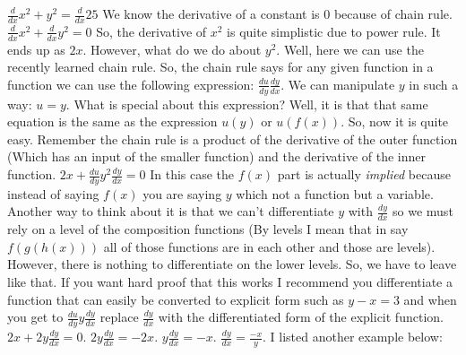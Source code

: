 \documentclass{article}
\begin{document}
\newline
\newline
$\frac{d}{dx} x^2+y^2=\frac{d}{dx}25$
\newline
We know the derivative of a constant is $0$ because of chain rule.
\newline
$\frac{d}{dx} x^2+\frac{d}{dx}y^2=0$
\newline
So, the derivative of $x^2$ is quite simplistic due to power rule. It ends up as $2x$. However, what do we do about $y^2$. Well, here we can use the recently learned chain rule. So, the chain rule says for any given function in a function we can use the following expression: $\frac{du}{dy}\frac{dy}{dx}$. We can manipulate $y$ in such a way: $u = y$. What is special about this expression? Well, it is that that same equation is the same as the expression $u(y)$ or $u(f(x))$. So, now it is quite easy. Remember the chain rule is a product of the derivative of the outer function (Which has an input of the smaller function) and the derivative of the inner function.
\newline
$2x+\frac{du}{dy}y^2\frac{dy}{dx}=0$
\newline
In this case the $f(x)$ part is actually \textit{implied} because instead of saying $f(x)$ you are saying $y$ which not a function but a variable. Another way to think about it is that we can't differentiate $y$ with $\frac{dy}{dx}$ so we must rely on a level of the composition functions (By levels I mean that in say $f(g(h(x)))$ all of those functions are in each other and those are levels). However, there is nothing to differentiate on the lower levels. So, we have to leave like that. If you want hard proof that this works I recommend you differentiate a function that can easily be converted to explicit form such as $y-x=3$ and when you get to $\frac{du}{dy}y\frac{dy}{dx}$ replace $\frac{dy}{dx}$ with the differentiated form of the explicit function.
\newline
$2x+2y\frac{dy}{dx}=0$.
\newline
\newline
$2y\frac{dy}{dx}=-2x$.
\newline
\newline
$y\frac{dy}{dx}=-x$.
\newline
\newline
$\frac{dy}{dx}=\frac{-x}{y}$.
\newline
\newline
I listed another example below:
\newline
\newline
\end{document}
